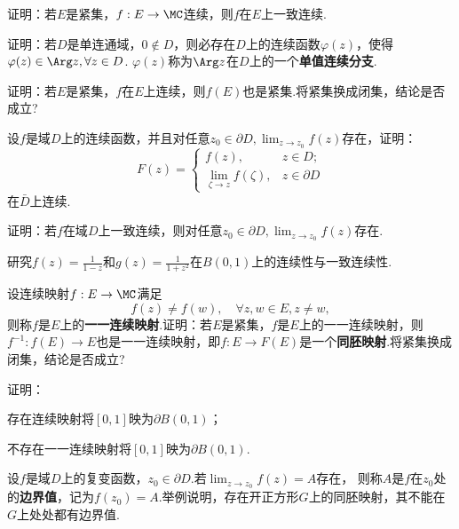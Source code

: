 \begin{xiti}\hypertarget{xiti1.7}{}
\item 证明：若$E$是紧集，$f:E\to\MC$连续，则$f$在$E$上一致连续.
\item 证明：若$D$是单连通域，$0\notin D$，则必存在$D$上的连续函数$\varphi(z)$，使得$\varphi(z)\in \Arg z,\forall z\in D$. $\varphi(z)$称为$\Arg z$在$D$上的一个\textbf{单值连续分支}.
\item 证明：若$E$是紧集，$f$在$E$上连续，则$f(E)$也是紧集.将紧集换成闭集，结论是否成立?
\item 设$f$是域$D$上的连续函数，并且对任意$z_0\in\partial D,\lim_{z\to z_0}f(z)$存在，证明：
\[F(z)=\begin{cases}
f(z),&z\in D;\\
\lim_{\zeta\to z}f(\zeta),&z\in \partial D
\end{cases}\]
在$\bar D$上连续.
\item 证明：若$f$在域$D$上一致连续，则对任意$z_0\in\partial D,\lim_{z\to z_0}f(z)$存在.
\item 研究$f(z)=\frac1{1-z}$和$g(z)=\frac1{1+z^2}$在$B(0,1)$上的连续性与一致连续性.
\item \hypertarget{xiti1.7.7}{} 设连续映射$f:E\to\MC$满足
  \[f(z)\ne f(w),\quad \forall z,w\in E,z\ne w,\]
则称$f$是$E$上的\textbf{一一连续映射}.证明：若$E$是紧集，$f$是$E$上的一一连续映射，则$f^{-1}:f(E)\to E$也是一一连续映射，即$f:E\to F(E)$是一个\textbf{同胚映射}.将紧集换成闭集，结论是否成立?
\item 证明：
\begin{enuma}
  \item 存在连续映射将$[0,1]$映为$\partial B(0,1)$；
  \item 不存在一一连续映射将$[0,1]$映为$\partial B(0,1)$.
\end{enuma}
\item 设$f$是域$D$上的复变函数，$z_0\in\partial D$.若$\lim_{z\to z_0}f(z)=A$存在，
则称$A$是$f$在$z_0$处的\textbf{边界值}，记为$f(z_0)=A$.举例说明，存在开正方形$G$上的同胚映射，其不能在$G$上处处都有边界值.
\end{xiti}
